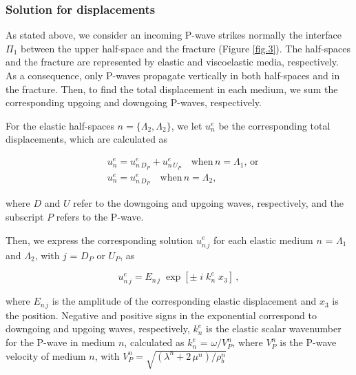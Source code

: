 \documentclass[draft]{agujournal2019}
\begin{document}
\subsubsection{Solution for displacements}
As stated above, we consider an incoming P-wave strikes normally the interface $\Pi_1$  between the upper half-space and the fracture (Figure \ref{fig.3}). The half-spaces and the fracture are represented by elastic and viscoelastic media, respectively. As a consequence, only P-waves propagate vertically in both half-spaces and in the fracture. Then, to find the total displacement in each medium, we sum the corresponding upgoing and downgoing P-waves, respectively.

For the elastic half-spaces $n =\{\Lambda_2, \Lambda_2\}$, we let $u_n^e$ be the corresponding total displacements, which are calculated as
\begin{linenomath*}
\begin{equation}\label{Eq.17}
\begin{split}
& u_n^e=  u_{n\,{D_P}}^e + u_{n\,{U_P}}^e \quad \text{when}\, n=\Lambda_1 , \, \text{or}  \\
& u_n^e = u_{n\,{D_P}}^e \quad \text{when}\, n=\Lambda_2 ,
\end{split}
\end{equation}
\end{linenomath*}
where $D$ and $U$ refer to the downgoing and upgoing waves, respectively, and the subscript $P$ refers to the P-wave.

Then, we express the corresponding solution $u_{n\,j}^e$ for each elastic medium $n$ = $\Lambda_1$ and $\Lambda_2$, with $j$ = $D_P$ or $U_P$, as
\begin{linenomath*}
\begin{equation}\label{Eq.18}
u_{n\,j}^e = E_{n \,j} \;\exp[ \pm\; i \; k_{n}^e \; x_3 ]\,,
\end{equation}
\end{linenomath*}
where $E_{n \,j}$ is the amplitude of the corresponding elastic displacement and $x_3$ is the position. Negative and positive signs in the exponential correspond to downgoing and upgoing waves, respectively, $ k_{n}^e$ is the elastic scalar wavenumber for the P-wave in medium $n$, calculated as $ k_{n}^e$ = $\omega / V_P^n$, where $V_P^n$ is the P-wave velocity of medium $n$, with $V_P^n = \sqrt{(\lambda^n +  2\, \mu^n)/\rho_b^n}$
\end{document}
